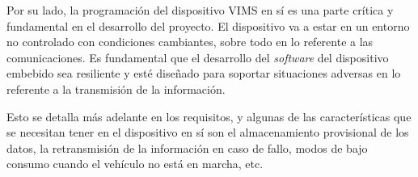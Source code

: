 Por su lado, la programación del dispositivo \ac{VIMS} en sí es una parte crítica y
fundamental en el desarrollo del proyecto. El dispositivo va a estar en un entorno
no controlado con condiciones cambiantes, sobre todo en lo referente a las comunicaciones.
Es fundamental que el desarrollo del \textit{software} del dispositivo embebido
sea resiliente y esté diseñado para soportar situaciones adversas en lo referente
a la transmisión de la información.

Esto se detalla más adelante en los requisitos, y algunas de las características que
se necesitan tener en el dispositivo en sí son el almacenamiento provisional de los
datos, la retransmisión de la información en caso de fallo, modos de bajo consumo
cuando el vehículo no está en marcha, etc.
